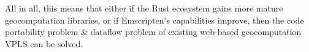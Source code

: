 All in all, this means that either if the Rust ecosystem gains more mature geocomputation libraries, or if Emscripten's capabilities improve, then the code portability problem \& dataflow problem of existing web-based geocomputation VPLS can be solved. 
















